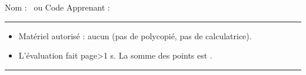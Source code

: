 

\SetDate[23/11/2026]
\reversemarginpar
\setlength{\marginparsep}{.5cm}




\null\vspace{-20pt}
Nom : \hrulefill ~ou Code Apprenant :  \rule{3cm}{.1pt}

\begin{itemize}[label=$\bullet$]
	\item
	Matériel autorisé : aucun (pas de polycopié, pas de calculatrice).
	\item
	L'évaluation fait \pageref{lastpage} page\ifnum{}>1 s\fi. La somme des points est .
\end{itemize}

\hrule 

\marginpar{[pts]}


